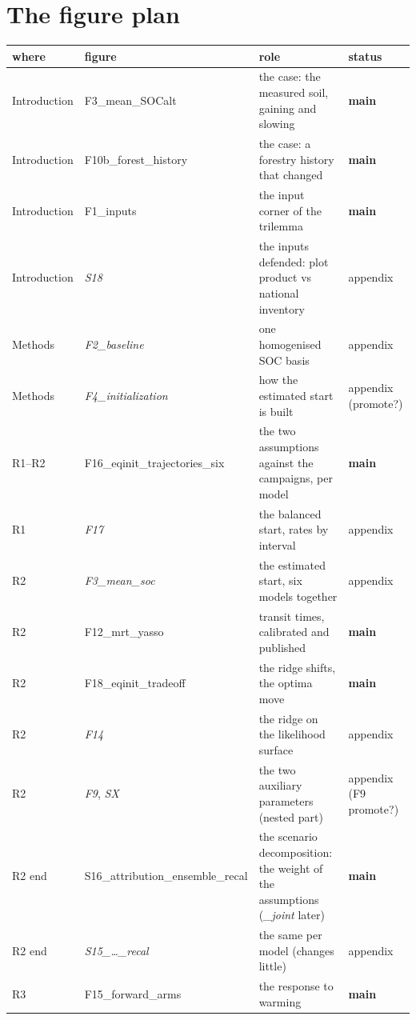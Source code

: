 \documentclass[11pt]{article}
\begin{document}
\clearpage
\section*{The figure plan}

\begin{center}\small
\begin{tabular}{llp{6.4cm}l}
\hline
where & figure & role & status \\
\hline
Introduction & F3\_mean\_SOCalt & the case: the measured soil, gaining and slowing & \textbf{main} \\
Introduction & F10b\_forest\_history & the case: a forestry history that changed & \textbf{main} \\
Introduction & F1\_inputs & the input corner of the trilemma & \textbf{main} \\
Introduction & \emph{S18} & the inputs defended: plot product vs national inventory & appendix \\
Methods & \emph{F2\_baseline} & one homogenised SOC basis & appendix \\
Methods & \emph{F4\_initialization} & how the estimated start is built & appendix (promote?) \\
R1--R2 & F16\_eqinit\_trajectories\_six & the two assumptions against the campaigns, per model & \textbf{main} \\
R1 & \emph{F17} & the balanced start, rates by interval & appendix \\
R2 & \emph{F3\_mean\_soc} & the estimated start, six models together & appendix \\
R2 & F12\_mrt\_yasso & transit times, calibrated and published & \textbf{main} \\
R2 & F18\_eqinit\_tradeoff & the ridge shifts, the optima move & \textbf{main} \\
R2 & \emph{F14} & the ridge on the likelihood surface & appendix \\
R2 & \emph{F9}, \emph{SX} & the two auxiliary parameters (nested part) & appendix (F9 promote?) \\
R2 end & S16\_attribution\_ensemble\_recal & the scenario decomposition: the weight of the assumptions (\emph{\_joint} later) & \textbf{main} \\
R2 end & \emph{S15\_\dots\_recal} & the same per model (changes little) & appendix \\
R3 & F15\_forward\_arms & the response to warming & \textbf{main} \\

\end{tabular}
\end{center}
\end{document}
